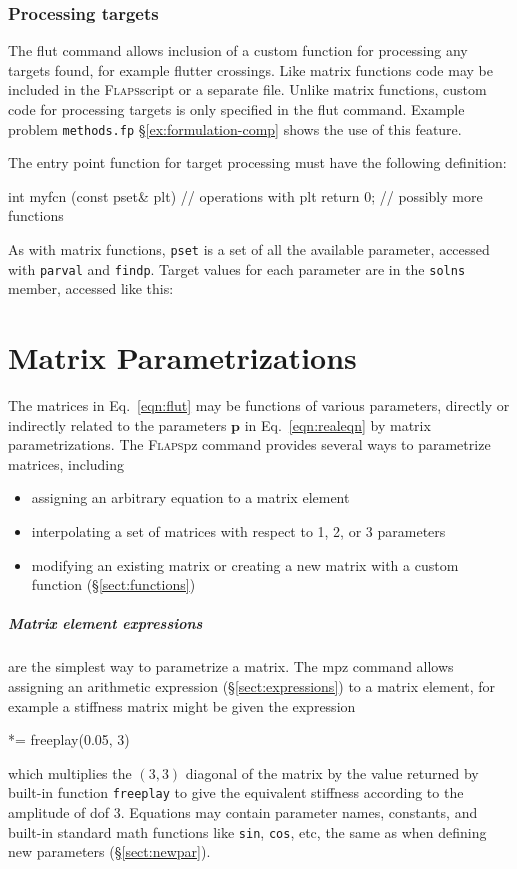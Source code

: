 \documentclass[10pt,openany,twoside]{book}
\numberwithin{equation}{section}   %
\newcommand{\Cmd}[1]{{\sf #1}}
\newcommand{\Code}[1]{{\small\tt #1}}
\newcommand{\Vector}[1]{\boldsymbol{#1}}
\newcommand{\Flaps}{{\normalfont\scshape Flaps\:}}
\newcommand{\Sectref}[1]{\S\ref{#1}}
\newcommand{\Eqn}[1]{Eq.\ \ref{#1}}
\begin{document}
\subsubsection{Processing targets}\label{sect:target-proc}
The \Cmd{flut} command allows inclusion of a custom function for processing
any targets found, for example flutter crossings. Like matrix functions code
may be included in the \Flaps script or a separate file. Unlike matrix
functions, custom code for processing targets is only specified in the
\Cmd{flut} command.
Example problem \Code{methods.fp} \Sectref{ex:formulation-comp} shows the
use of this feature.

The entry point function for target processing must have the following
definition:
\begin{example}
   int myfcn (const pset& plt) {
      // operations with plt
      return 0;
   }
   // possibly more functions
\end{example}
As with matrix functions, \Code{pset} is a set of all the available
parameter, accessed with \Code{parval} and \Code{findp}.
Target values for each parameter are in the \Code{solns} member,
accessed like this:
\begin{example}
   Par* freqp = plt.findp("freq");
   for (int i=0; i<plt.nsolns(); i++) {
      double freq = freqp->solns[i];
         ...
\end{example}


\section{Matrix Parametrizations}\label{sect:pz}
The matrices in \Eqn{eqn:flut} may be functions of various parameters, directly
or indirectly related to the parameters $\Vector{p}$ in \Eqn{eqn:realeqn} by
matrix parametrizations.
The \Flaps \Cmd{pz} command provides several ways to
parametrize matrices, including
\begin{itemize}
\item assigning an arbitrary equation to a matrix element
\item interpolating a set of matrices with respect to 1, 2, or 3 parameters
\item modifying an existing matrix or creating a new matrix
      with a custom function (\Sectref{sect:functions})
\end{itemize}

\subparagraph{Matrix element expressions} are the simplest way
to parametrize a matrix. The \Cmd{mpz} command allows assigning
an arithmetic expression (\Sectref{sect:expressions}) to a matrix element,
for example a stiffness matrix might be given the expression
\begin{example}
[3,3] *= freeplay(0.05, 3)
\end{example}
which multiplies the $(3,3)$ diagonal of the matrix by the value
returned by built-in function \Code{freeplay} to give
the equivalent stiffness according to the amplitude of dof 3.
Equations may contain parameter names, constants, and built-in
standard math functions like \Code{sin}, \Code{cos}, etc,
the same as when defining new parameters (\Sectref{sect:newpar}).
\end{document}
